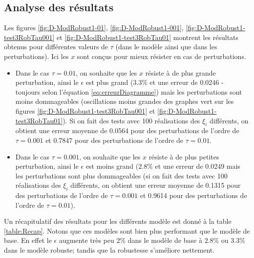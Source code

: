 \subsection{Analyse des résultats}
Les figures \ref{fig:D-ModRobust1-01}, \ref{fig:D-ModRobust1-001}, \ref{fig:D-ModRobust1-test3RobTau001} et \ref{fig:D-ModRobust1-test3RobTau01} montrent les résultats obtenus pour différentes valeurs de $\tau$ (dans le modèle ainsi que dans les perturbations). Ici les $x$ sont conçus pour mieux résister en cas de perturbations. \\
\begin{itemize}
 \item Dans le cas $\tau = 0.01$, on souhaite que les $x$ résiste à de plus grande perturbation, ainsi le $\epsilon$ est plus grand ($3.3 \%$ et une erreur de 0.0246 - toujours selon l'équation \ref{eq:erreurDiagramme}) mais les perturbations sont moins dommageables (oscillations moins grandes des graphes vert sur les figures \ref{fig:D-ModRobust1-test3RobTau001} et \ref{fig:D-ModRobust1-test3RobTau01}).  Si on fait des tests avec 100 réalisations des $\xi_i$ différents, on obtient une erreur moyenne de  0.0564 pour des perturbations de l'ordre de $\tau=0.001$ et 0.7847 pour des perturbations de l'ordre de $\tau=0.01$.\\
\item Dans le cas $\tau = 0.001$, on souhaite que les $x$ résiste à de plus petites perturbation, ainsi le $\epsilon$ est moins grand ($2.8 \%$ et une erreur de  0.0249 mais les perturbations sont plus dommageables (si on fait des tests avec 100 réalisations des $\xi_i$ différents, on obtient une erreur moyenne de 0.1315 pour des perturbations de l'ordre de $\tau=0.001$ et 0.9614 pour des perturbations de l'ordre de $\tau=0.01$).\\  
\end{itemize}
Un récapitulatif des résultats pour les différents modèle est donné à la table \ref{table:Recap}. Notons que ces modèles sont bien plus performant que le modèle de base. En effet le $\epsilon$ augmente très peu $2\%$ dans le modèle de base à $2.8\%$ ou $3.3\%$ dans le modèle robuste; tandis que la robustesse s'améliore nettement.

